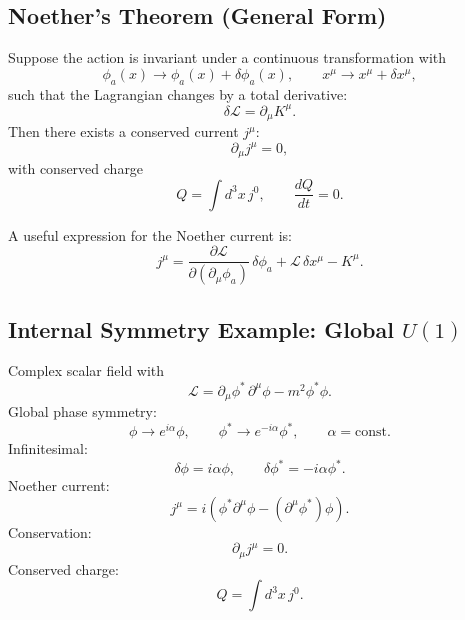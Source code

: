 \subsection{Noether's Theorem (General Form)}
Suppose the action is invariant under a continuous transformation with
\begin{equation}
\phi_a(x)\to \phi_a(x)+\delta\phi_a(x),
\qquad
x^\mu\to x^\mu+\delta x^\mu,
\end{equation}
such that the Lagrangian changes by a total derivative:
\begin{equation}
\delta\mathcal{L} = \partial_\mu K^\mu.
\end{equation}
Then there exists a conserved current $j^\mu$:
\begin{equation}
\partial_\mu j^\mu=0,
\end{equation}
with conserved charge
\begin{equation}
Q = \int d^3x\, j^0,
\qquad
\frac{dQ}{dt}=0.
\end{equation}

A useful expression for the Noether current is:
\begin{equation}
j^\mu
=
\frac{\partial\mathcal{L}}{\partial(\partial_\mu\phi_a)}\,\delta\phi_a
+\mathcal{L}\,\delta x^\mu
- K^\mu.
\end{equation}

\subsection{Internal Symmetry Example: Global $U(1)$}
Complex scalar field with
\begin{equation}
\mathcal{L}=\partial_\mu\phi^\ast\,\partial^\mu\phi - m^2\phi^\ast\phi.
\end{equation}
Global phase symmetry:
\begin{equation}
\phi \to e^{i\alpha}\phi,
\qquad
\phi^\ast \to e^{-i\alpha}\phi^\ast,
\qquad
\alpha=\text{const}.
\end{equation}
Infinitesimal:
\begin{equation}
\delta\phi = i\alpha\phi,
\qquad
\delta\phi^\ast=-i\alpha\phi^\ast.
\end{equation}
Noether current:
\begin{equation}
j^\mu
=
i\left(\phi^\ast\partial^\mu\phi-(\partial^\mu\phi^\ast)\phi\right).
\end{equation}
Conservation:
\begin{equation}
\partial_\mu j^\mu=0.
\end{equation}
Conserved charge:
\begin{equation}
Q=\int d^3x\, j^0.
\end{equation}

